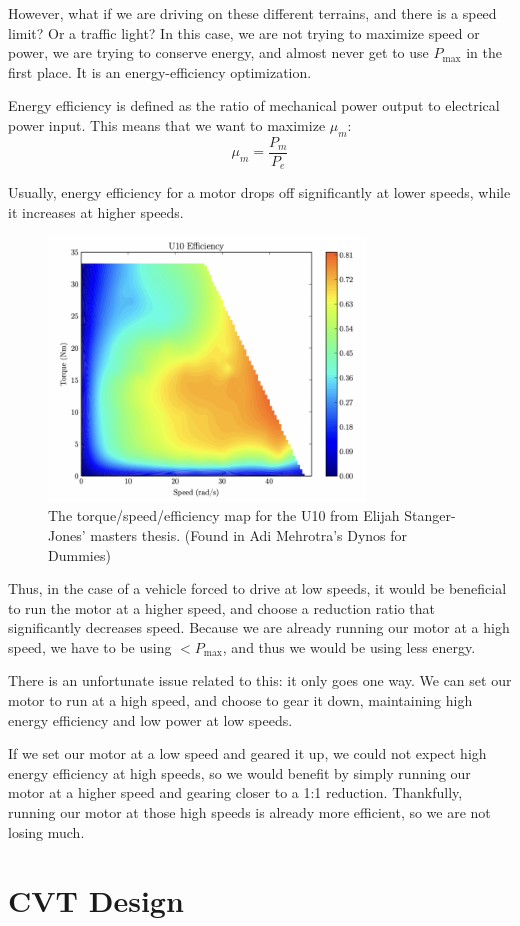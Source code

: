 \documentclass[12pt]{article}
\begin{document}
However, what if we are driving on these different terrains, and there is a speed limit? Or a traffic light? In this case, we are not trying to maximize speed or power, we are trying to conserve energy, and almost never get to use $P_{\max}$ in the first place. It is an energy-efficiency optimization.

Energy efficiency is defined as the ratio of mechanical power output to electrical power input. This means that we want to maximize $\mu_{m}$:
\begin{equation}
  \mu_{m} = \frac{P_{m}}{P_{e}}
\end{equation}

Usually, energy efficiency for a motor drops off significantly at lower speeds, while it increases at higher speeds. 

\begin{figure}[H]
  \centering
  \includegraphics[width=0.75\textwidth]{motor-efficiency.png}
  \caption{The torque/speed/efficiency map for the U10 from Elijah Stanger-Jones’ masters thesis. (Found in Adi Mehrotra's Dynos for Dummies)}\label{fig:motor_efficiency}
\end{figure}

Thus, in the case of a vehicle forced to drive at low speeds, it would be beneficial to run the motor at a higher speed, and choose a reduction ratio that significantly decreases speed. Because we are already running our motor at a high speed, we have to be using $< P_{\max}$, and thus we would be using less energy.

There is an unfortunate issue related to this: it only goes one way. We can set our motor to run at a high speed, and choose to gear it down, maintaining high energy efficiency and low power at low speeds. 

If we set our motor at a low speed and geared it up, we could not expect high energy efficiency at high speeds, so we would benefit by simply running our motor at a higher speed and gearing closer to a 1:1 reduction. Thankfully, running our motor at those high speeds is already more efficient, so we are not losing much.

\section{CVT Design}
\end{document}
